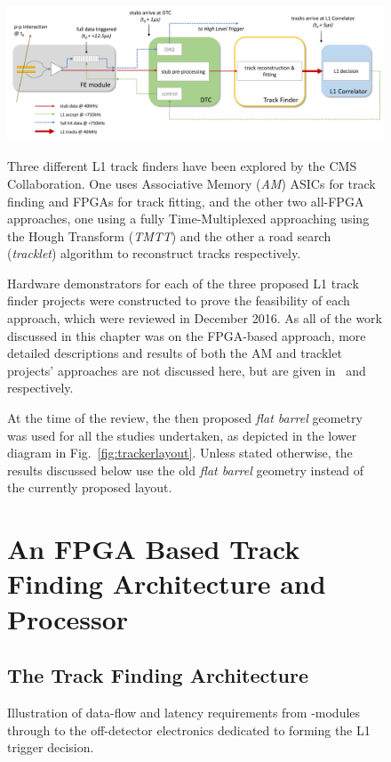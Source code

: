 \begin{figure}[tb]
\centering
\includegraphics[width=\textwidth]{figs/tk-upgrade/dataflow.pdf}
\caption{Illustration of data-flow and latency requirements from \pt-modules through to the off-detector electronics dedicated to forming the L1 trigger decision.}
\label{fig:dataFlow}

Three different L1 track finders have been explored by the CMS Collaboration.
One uses Associative Memory (\emph{AM}) ASICs for track finding and FPGAs for track fitting, and the other two all-FPGA approaches, one using a fully Time-Multiplexed approaching using the Hough Transform (\emph{TMTT}) and the other a road search (\emph{tracklet}) algorithm to reconstruct tracks respectively.

Hardware demonstrators for each of the three proposed L1 track finder projects were constructed to prove the feasibility of each approach, which were reviewed in December 2016.
As all of the work discussed in this chapter was on the FPGA-based \HT approach, more detailed descriptions and results of both the AM and tracklet projects' approaches are not discussed here, but are given in~\cite{AM,P2TrackerTDR} and~\cite{tracklet,P2TrackerTDR} respectively.

At the time of the review, the then proposed \emph{flat barrel} geometry~\cite{CMS_Upgrade_TP} was used for all the studies undertaken, as depicted in the lower diagram in Fig.~\ref{fig:trackerlayout}.
Unless stated otherwise, the results discussed below use the old \emph{flat barrel} geometry instead of the currently proposed layout.

\section{An FPGA Based Track Finding Architecture and Processor}
\subsection{The Track Finding Architecture}


\end{figure}
